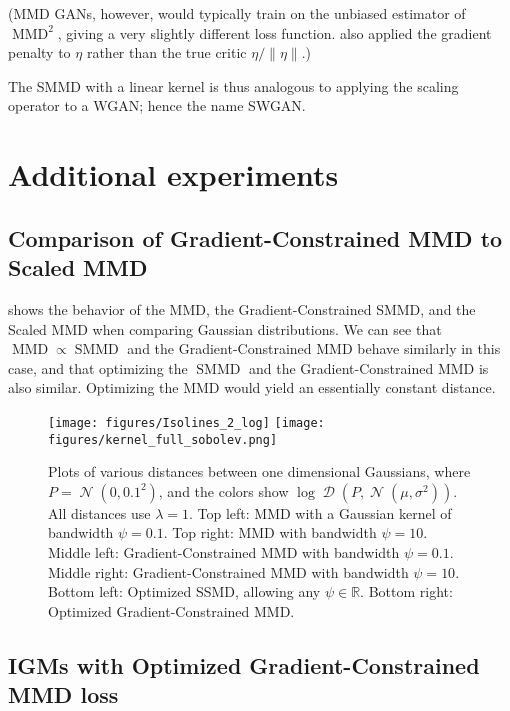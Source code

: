 \documentclass{article}
\DeclareMathOperator{\D}{\mathcal D}
\DeclareMathOperator{\N}{\mathcal N}
\newcommand{\R}{\mathbb R}
\DeclareMathOperator{\MMD}{MMD}
\DeclareMathOperator{\SMMD}{SMMD}
\begin{document}
(MMD GANs, however, would typically train on the unbiased estimator of $\MMD^2$,
giving a very slightly different loss function.
\cite{Binkowski:2018} also applied the gradient penalty to $\eta$ rather than the true critic $\eta / \lVert \eta \rVert$.)

The SMMD with a linear kernel is thus analogous to applying the scaling operator to a WGAN;
hence the name SWGAN.


\section{Additional experiments}

\subsection{Comparison of Gradient-Constrained MMD to Scaled MMD} \label{appendix:gcmmd-smmd}

 shows the behavior of the MMD, the Gradient-Constrained SMMD, and the Scaled MMD when comparing Gaussian distributions.
We can see that $\MMD \propto \SMMD$ and the Gradient-Constrained MMD behave similarly in this case,
and that optimizing the $\SMMD$ and the Gradient-Constrained MMD is also similar.
Optimizing the MMD would yield an essentially constant distance.

\begin{figure}[p]
  \centering
  \texttt{[image: figures/Isolines\_2\_log]}
  \texttt{[image: figures/kernel\_full\_sobolev.png]}
  \caption{Plots of various distances between one dimensional Gaussians,
    where $P = \N(0, 0.1^2)$,
    and the colors show $\log \D(P, \N(\mu, \sigma^2))$.
    All distances use $\lambda = 1$.
    Top left: MMD with a Gaussian kernel of bandwidth $\psi = 0.1$.
    Top right: MMD with bandwidth $\psi = 10$.
    Middle left: Gradient-Constrained MMD with bandwidth $\psi = 0.1$.
    Middle right: Gradient-Constrained MMD with bandwidth $\psi = 10$.
    Bottom left: Optimized SSMD, allowing any $\psi \in \R$.
    Bottom right: Optimized Gradient-Constrained MMD.
}
  \label{fig:isolines}
\end{figure}

\subsection{IGMs with Optimized Gradient-Constrained MMD loss} \label{appendix:sobolev-expt}
\end{document}

